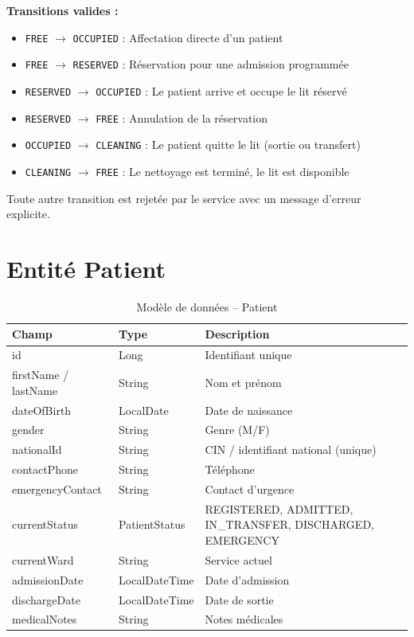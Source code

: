 \documentclass[12pt,a4paper]{report}
\begin{document}
\textbf{Transitions valides :}
\begin{itemize}
    \item \texttt{FREE} $\rightarrow$ \texttt{OCCUPIED} : Affectation directe d'un patient
    \item \texttt{FREE} $\rightarrow$ \texttt{RESERVED} : R\'eservation pour une admission programm\'ee
    \item \texttt{RESERVED} $\rightarrow$ \texttt{OCCUPIED} : Le patient arrive et occupe le lit r\'eserv\'e
    \item \texttt{RESERVED} $\rightarrow$ \texttt{FREE} : Annulation de la r\'eservation
    \item \texttt{OCCUPIED} $\rightarrow$ \texttt{CLEANING} : Le patient quitte le lit (sortie ou transfert)
    \item \texttt{CLEANING} $\rightarrow$ \texttt{FREE} : Le nettoyage est termin\'e, le lit est disponible
\end{itemize}

Toute autre transition est rejet\'ee par le service avec un message d'erreur explicite.

\section{Entit\'e Patient}

\begin{table}[H]
    \centering
    \begin{tabularx}{\textwidth}{llX}
        \toprule
        \textbf{Champ} & \textbf{Type} & \textbf{Description} \\
        \midrule
        id & Long & Identifiant unique \\
        firstName / lastName & String & Nom et pr\'enom \\
        dateOfBirth & LocalDate & Date de naissance \\
        gender & String & Genre (M/F) \\
        nationalId & String & CIN / identifiant national (unique) \\
        contactPhone & String & T\'el\'ephone \\
        emergencyContact & String & Contact d'urgence \\
        currentStatus & PatientStatus & REGISTERED, ADMITTED, IN\_TRANSFER, DISCHARGED, EMERGENCY \\
        currentWard & String & Service actuel \\
        admissionDate & LocalDateTime & Date d'admission \\
        dischargeDate & LocalDateTime & Date de sortie \\
        medicalNotes & String & Notes m\'edicales \\
        \bottomrule
    \end{tabularx}
    \caption{Mod\`ele de donn\'ees -- Patient}
\end{table}
\end{document}
